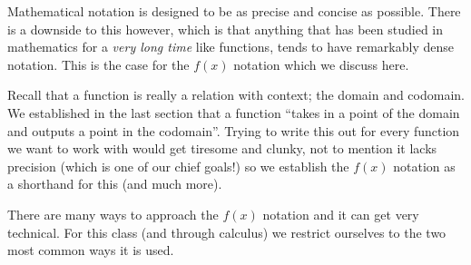 \documentclass{ximera}
\begin{document}



    Mathematical notation is designed to be as precise and concise as possible. There is a downside to this however, which is that anything that has been studied in mathematics for a \textit{very long time} like functions, tends to have remarkably dense notation. This is the case for the $f(x)$ notation which we discuss here.
    
    Recall that a function is really a relation with context; the domain and codomain. We established in the last section that a function ``takes in a point of the domain and outputs a point in the codomain''. Trying to write this out for every function we want to work with would get tiresome and clunky, not to mention it lacks precision (which is one of our chief goals!) so we establish the $f(x)$ notation as a shorthand for this (and much more).
    
    There are many ways to approach the $f(x)$ notation and it can get very technical. For this class (and through calculus) we restrict ourselves to the two most common ways it is used.
    
\end{document}
